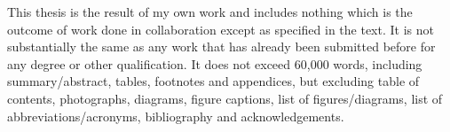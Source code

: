
\begin{declaration}
This thesis is the result of my own work and includes nothing which is the outcome of work done in collaboration except as specified in the text. It is not substantially the same as any work that has already been submitted before for any degree or other qualification. It does not exceed 60,000 words, including summary/abstract, tables, footnotes and appendices, but excluding table of contents, photographs, diagrams, figure captions, list of figures/diagrams, list of abbreviations/acronyms, bibliography and acknowledgements.




\end{declaration}